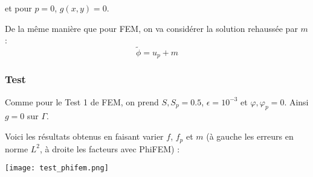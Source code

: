 et pour $p=0$, $g(x,y)=0$.

De la même manière que pour FEM, on va considérer la solution rehaussée par $m$ :
$$\tilde{\phi}=u_p+m$$

\subsubsection*{Test}

Comme pour le Test 1 de FEM, on prend $S,S_p=0.5$, $\epsilon=10^{-3}$ et $\varphi,\varphi_p=0$. Ainsi $g=0$ sur $\Gamma$. 

Voici les résultats obtenus en faisant varier $f$, $f_p$ et $m$ (à gauche les erreurs en norme $L^2$, à droite les facteurs avec PhiFEM) :

\begin{minipage}{\linewidth}
	\centering
	\texttt{[image: test\_phifem.png]}
\end{minipage}

